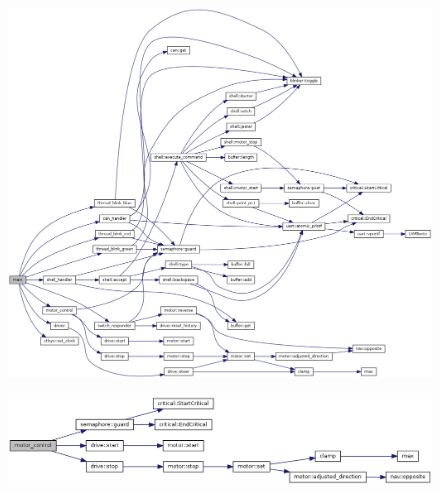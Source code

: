 \documentclass[12pt]{article}
\begin{document}
\begin{figure}[H]
  \includegraphics[width=\textwidth]{./img/move_main.png}
\end{figure}

\begin{figure}[H]
  \includegraphics[width=\textwidth]{./img/motor_control.png}
\end{figure}
\end{document}
